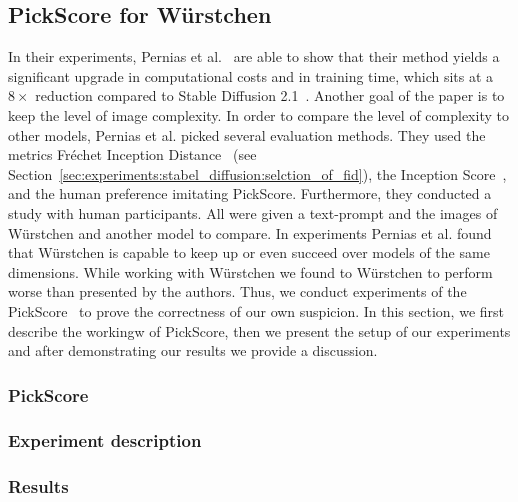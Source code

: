 \subsection{PickScore for W\"urstchen}
In their experiments, Pernias et al.~\cite{pernias2024wrstchen} are able to show
that their method yields a significant upgrade in computational costs and in
training time, which sits at a $8\times$ reduction compared to Stable Diffusion
2.1~\cite{rombach2023sd_2_1}. Another goal of the paper is to keep the level of
image complexity. In order to compare the level of complexity to other models,
Pernias et al. picked several evaluation methods. They used the metrics
Fr\'echet Inception Distance~\cite{heusel2018ganstrainedtimescaleupdate} (see
Section~\ref{sec:experiments:stabel_diffusion:selction_of_fid}), the Inception
Score~\cite{ding2021cogviewmasteringtexttoimagegeneration}, and the human preference imitating
PickScore. Furthermore, they conducted a study with human participants. All were
given a text-prompt and the images of W\"urstchen and another model to compare.
In experiments Pernias et al. found that W\"urstchen is capable to keep up or
even succeed over models of the same dimensions. While working with W\"urstchen
we found to W\"urstchen to perform worse than presented by the authors. Thus, we
conduct experiments of the PickScore~\cite{Kirstain2023PickaPicAO} to
prove the correctness of our own suspicion. In this section, we first describe
the workingw of PickScore, then we present the setup of our experiments and
after demonstrating our results we provide a discussion.

\subsubsection{PickScore}
%
\subsubsection{Experiment description}
\subsubsection{Results}
